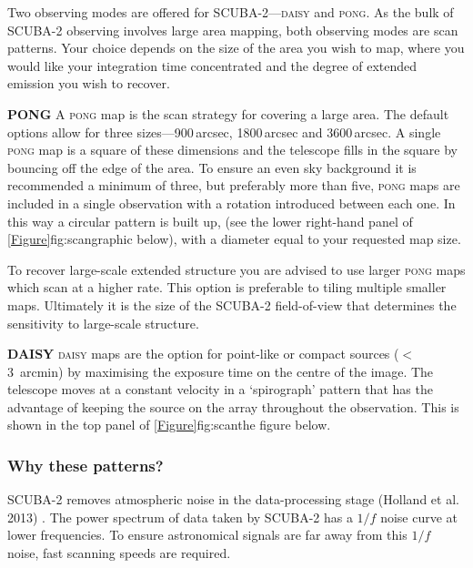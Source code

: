\documentclass[11pt,oneside,chapters]{starlink}
\begin{document}
Two observing modes are offered for SCUBA-2---\textsc{daisy} and
\textsc{pong}. As the bulk of \mbox{SCUBA-2} observing involves
large area mapping, both observing modes are scan patterns. Your
choice depends on the size of the area you wish to map, where you
would like your integration time concentrated and the degree of
extended emission you wish to recover.

\begin{aligndesc}
\item[\textbf{PONG}]
A \textsc{pong} map is the scan
strategy for covering a large area. The default options allow for three
sizes---900\,arcsec, 1800\,arcsec and 3600\,arcsec. A single \textsc{pong} map is
a square of these dimensions and the telescope fills in the square by
bouncing off the edge of the area. To ensure an even sky background it
is recommended a minimum of three, but preferably more than five,
\textsc{pong} maps are included in a single observation with a
rotation introduced between each one. In this way a circular pattern
is built up, (see the lower right-hand panel of \cref{Figure}{fig:scan}{graphic below}),
with a diameter equal to your requested map size.

To recover large-scale extended structure you are advised to use
larger \textsc{pong} maps which scan at a higher rate. This option is
preferable to tiling multiple smaller maps. Ultimately it is the
size of the SCUBA-2 field-of-view that determines the sensitivity to
large-scale structure.

\item[\textbf{DAISY}]
\textsc{daisy} maps are the option for point-like or compact sources
($<$3~arcmin) by maximising the exposure time on the centre of the
image. The telescope moves at a constant velocity in a `spirograph'
pattern that has the advantage of keeping the source on the array
throughout the observation. This is shown in the top panel of
\cref{Figure}{fig:scan}{the figure below}.
\end{aligndesc}

\subsubsection{Why these patterns?}%

SCUBA-2 removes atmospheric noise in the data-processing
stage (Holland et al. 2013) \cite{s2main}. The power spectrum
of data taken by SCUBA-2 has a $1/f$ noise curve at lower frequencies. To
ensure astronomical signals are far away from this $1/f$ noise, fast
scanning speeds are required.
\end{document}
